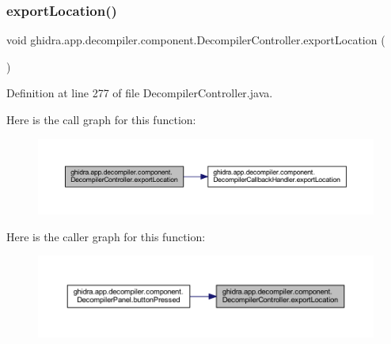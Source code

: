 \subsubsection{\texorpdfstring{exportLocation()}{exportLocation()}}
{\footnotesize\ttfamily void ghidra.\+app.\+decompiler.\+component.\+Decompiler\+Controller.\+export\+Location (\begin{DoxyParamCaption}{ }\end{DoxyParamCaption})\hspace{0.3cm}{\ttfamily [inline]}}



Definition at line 277 of file Decompiler\+Controller.\+java.

Here is the call graph for this function\+:
\nopagebreak
\begin{figure}[H]
\begin{center}
\leavevmode
\includegraphics[width=350pt]{classghidra_1_1app_1_1decompiler_1_1component_1_1_decompiler_controller_a44c803e49982c114b829c62bd114b7d7_cgraph}
\end{center}
\end{figure}
Here is the caller graph for this function\+:
\nopagebreak
\begin{figure}[H]
\begin{center}
\leavevmode
\includegraphics[width=350pt]{classghidra_1_1app_1_1decompiler_1_1component_1_1_decompiler_controller_a44c803e49982c114b829c62bd114b7d7_icgraph}
\end{center}
\end{figure}
\mbox{\label{classghidra_1_1app_1_1decompiler_1_1component_1_1_decompiler_controller_a5030159d194659d184eaf4569726bb05}} 
